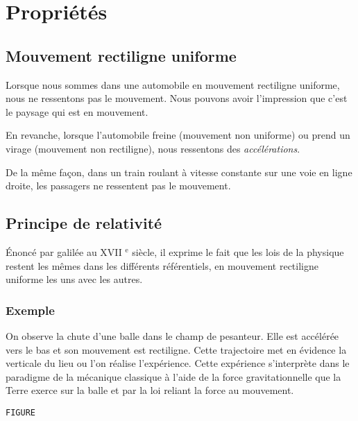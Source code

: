 

\section{Propriétés}

    \subsection{Mouvement rectiligne uniforme}

Lorsque nous sommes dans une automobile en mouvement rectiligne uniforme, nous ne ressentons pas le mouvement. Nous pouvons avoir l'impression que c'est le paysage qui est en mouvement.

 En revanche, lorsque l'automobile freine (mouvement non uniforme) ou prend un virage (mouvement non rectiligne), nous ressentons des {\it accélérations}.

De la même façon, dans un train roulant à vitesse constante sur une voie en ligne droite, les passagers ne ressentent pas le mouvement.

\begin{center}

\end{center}


  \subsection{Principe de relativité}

Énoncé par galilée au {\footnotesize XVII} $^\text{e}$ siècle, il exprime le fait que les lois de la physique restent les mêmes dans les différents référentiels, en mouvement rectiligne uniforme les uns avec les autres.

    \subsubsection{Exemple}

On observe la chute d'une balle dans le champ de pesanteur. Elle est accélérée vers le bas et son mouvement est rectiligne. Cette trajectoire met en évidence la verticale du lieu ou l'on réalise l'expérience. Cette expérience s'interprète dans le paradigme de la mécanique classique à l'aide de la force gravitationnelle que la Terre exerce sur la balle et par la loi reliant la force au mouvement.

\begin{center}
%
\texttt{FIGURE}
\end{center}

